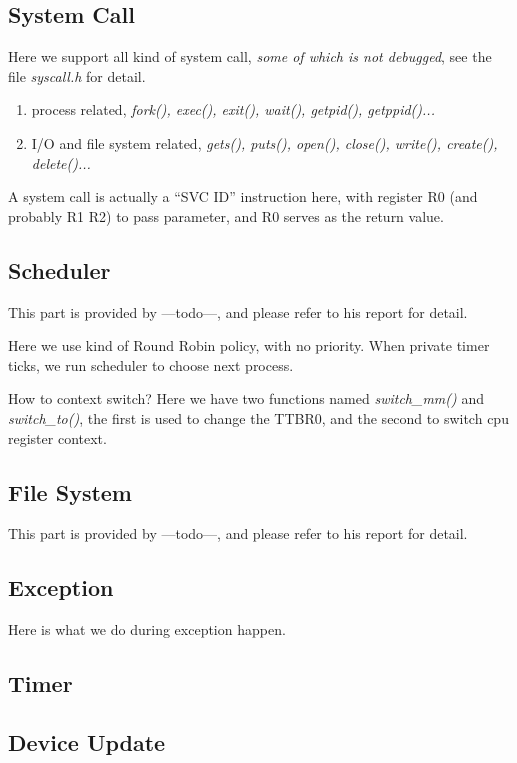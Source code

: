 \documentclass{article}
\begin{document}
\subsection{System Call}
Here we support all kind of system call, \emph{some of which is not debugged}, see the file \emph{syscall.h} for detail.

\begin{enumerate}
	\item	process related, \emph{fork(), exec(), exit(), wait(), getpid(), getppid()...}
	\item I/O and file system related, \emph{gets(), puts(), open(), close(), write(), create(), delete()...}
\end{enumerate}

A system call is actually a ``SVC ID'' instruction here, with register R0 (and probably R1 R2) to pass parameter, and R0 serves as the return value.

\subsection{Scheduler}
This part is provided by ---todo---, and please refer to his report for detail.

Here we use kind of Round Robin policy, with no priority. When private timer ticks, we run scheduler to choose next process.

How to context switch? Here we have two functions named \emph{switch\_mm()} and \emph{switch\_to()}, the first is used to change the TTBR0, and the second to switch cpu register context.

\subsection{File System}

This part is provided by ---todo---, and please refer to his report for detail.


\subsection{Exception}

Here is what we do during exception happen.

\subsection{Timer}

\subsection{Device Update}
\end{document}
